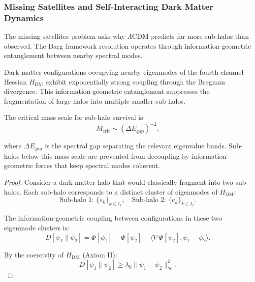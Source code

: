 \subsubsection{Missing Satellites and Self-Interacting Dark Matter Dynamics}
\label{subsubsec:missingSatellites}

\begin{lemma}
\label{lem:spectralTruncationSubHalos}

The missing satellites problem asks why $\Lambda$CDM predicts far more sub-halos than observed. The Barg framework resolution operates through information-geometric entanglement between nearby spectral modes.

Dark matter configurations occupying nearby eigenmodes of the fourth channel Hessian $H_{\text{DM}}$ exhibit exponentially strong coupling through the Bregman divergence. This information-geometric entanglement suppresses the fragmentation of large halos into multiple smaller sub-halos.

The critical mass scale for sub-halo survival is:
\begin{equation}
M_{\text{crit}} \sim (\Delta E_{\text{gap}})^{-2},
\end{equation}

where $\Delta E_{\text{gap}}$ is the spectral gap separating the relevant eigenvalue bands. Sub-halos below this mass scale are prevented from decoupling by information-geometric forces that keep spectral modes coherent.

\begin{proof}

Consider a dark matter halo that would classically fragment into two sub-halos. Each sub-halo corresponds to a distinct cluster of eigenmodes of $H_{\text{DM}}$:
\begin{equation}
\text{Sub-halo 1: } \{e_k\}_{k \in I_1}, \quad \text{Sub-halo 2: } \{e_k\}_{k \in I_2}.
\end{equation}

The information-geometric coupling between configurations in these two eigenmode clusters is:
\begin{equation}
D[\psi_1 \| \psi_2] = \Phi[\psi_1] - \Phi[\psi_2] - \langle \nabla \Phi[\psi_2], \psi_1 - \psi_2 \rangle.
\end{equation}

By the coercivity of $H_{\text{DM}}$ (Axiom II):
\begin{equation}
D[\psi_1 \| \psi_2] \geq \lambda_0 \|\psi_1 - \psi_2\|_{\mathcal{H}}^2.
\end{equation}


\end{proof}
\end{lemma}
